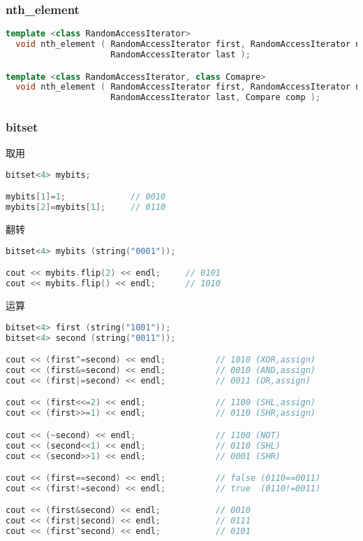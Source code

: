     \subsubsection{nth\_element}
	\begin{lstlisting}[language=c++]
template <class RandomAccessIterator>
  void nth_element ( RandomAccessIterator first, RandomAccessIterator nth,
                     RandomAccessIterator last );

template <class RandomAccessIterator, class Comapre>
  void nth_element ( RandomAccessIterator first, RandomAccessIterator nth,
                     RandomAccessIterator last, Compare comp );
	\end{lstlisting}
	
    \subsubsection{bitset}
	取用\\
	\begin{lstlisting}[language=c++]
bitset<4> mybits;

mybits[1]=1;             // 0010
mybits[2]=mybits[1];     // 0110
	\end{lstlisting}
	翻转\\
	\begin{lstlisting}[language=c++]
bitset<4> mybits (string("0001"));

cout << mybits.flip(2) << endl;     // 0101
cout << mybits.flip() << endl;      // 1010
	\end{lstlisting}
	运算\\
	\begin{lstlisting}[language=c++]
bitset<4> first (string("1001"));
bitset<4> second (string("0011"));

cout << (first^=second) << endl;          // 1010 (XOR,assign)
cout << (first&=second) << endl;          // 0010 (AND,assign)
cout << (first|=second) << endl;          // 0011 (OR,assign)

cout << (first<<=2) << endl;              // 1100 (SHL,assign)
cout << (first>>=1) << endl;              // 0110 (SHR,assign)

cout << (~second) << endl;                // 1100 (NOT)
cout << (second<<1) << endl;              // 0110 (SHL)
cout << (second>>1) << endl;              // 0001 (SHR)

cout << (first==second) << endl;          // false (0110==0011)
cout << (first!=second) << endl;          // true  (0110!=0011)

cout << (first&second) << endl;           // 0010
cout << (first|second) << endl;           // 0111
cout << (first^second) << endl;           // 0101
	\end{lstlisting}
	
